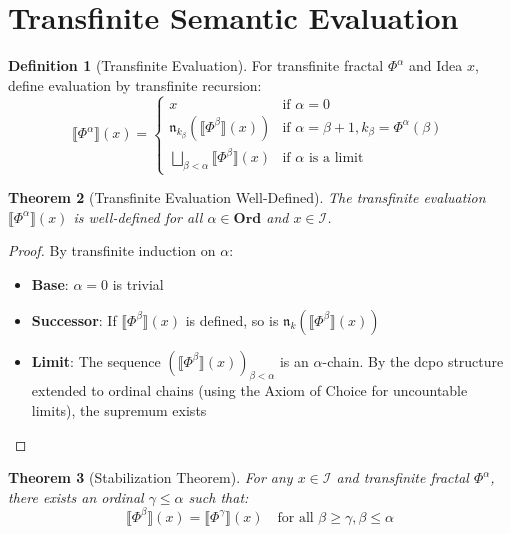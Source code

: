 \documentclass[11pt,twoside,openright]{book}
\theoremstyle{definition}
\newtheorem{definition}{Definition}[chapter]
\theoremstyle{plain}
\newtheorem{theorem}[definition]{Theorem}
\theoremstyle{remark}
\newcommand{\sem}[1]{\llbracket #1 \rrbracket}
\newcommand{\Ideas}{\mathcal{I}}
\newcommand{\Ord}{\mathbf{Ord}}              %
\newcommand{\TransFrac}[1]{\Phi^{#1}}        %
\begin{document}
\section{Transfinite Semantic Evaluation}

\begin{definition}[Transfinite Evaluation]
\label{def:transfinite-eval}
For transfinite fractal $\TransFrac{\alpha}$ and Idea $x$, define evaluation by transfinite recursion:
\[
\sem{\TransFrac{\alpha}}(x) =
\begin{cases}
x & \text{if } \alpha = 0 \\
\mathfrak{n}_{k_\beta}(\sem{\TransFrac{\beta}}(x)) & \text{if } \alpha = \beta + 1, k_\beta = \TransFrac{\alpha}(\beta) \\
\bigsqcup_{\beta < \alpha} \sem{\TransFrac{\beta}}(x) & \text{if } \alpha \text{ is a limit}
\end{cases}
\]
\end{definition}

\begin{theorem}[Transfinite Evaluation Well-Defined]
\label{thm:transfinite-eval-defined}
The transfinite evaluation $\sem{\TransFrac{\alpha}}(x)$ is well-defined for all $\alpha \in \Ord$ and $x \in \Ideas$.
\end{theorem}

\begin{proof}
By transfinite induction on $\alpha$:
\begin{itemize}
  \item \textbf{Base}: $\alpha = 0$ is trivial
  \item \textbf{Successor}: If $\sem{\TransFrac{\beta}}(x)$ is defined, so is $\mathfrak{n}_k(\sem{\TransFrac{\beta}}(x))$
  \item \textbf{Limit}: The sequence $(\sem{\TransFrac{\beta}}(x))_{\beta < \alpha}$ is an $\alpha$-chain. By the dcpo structure extended to ordinal chains (using the Axiom of Choice for uncountable limits), the supremum exists
\end{itemize}
\end{proof}

\begin{theorem}[Stabilization Theorem]
\label{thm:stabilization}
For any $x \in \Ideas$ and transfinite fractal $\TransFrac{\alpha}$, there exists an ordinal $\gamma \leq \alpha$ such that:
\[
\sem{\TransFrac{\beta}}(x) = \sem{\TransFrac{\gamma}}(x) \quad \text{for all } \beta \geq \gamma, \beta \leq \alpha
\]
\end{theorem}
\end{document}
